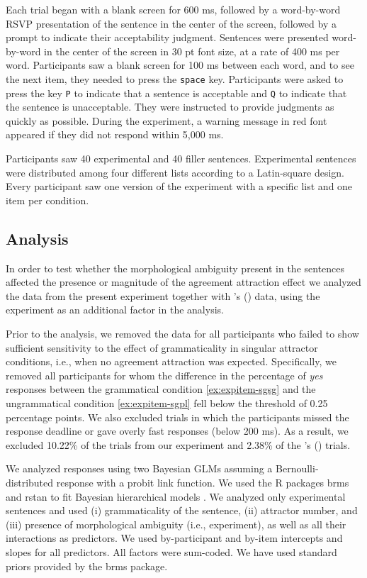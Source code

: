 \documentclass[apacite,linguex]{glossa}\usepackage[]{graphicx}\usepackage[]{color}
\begin{document}
Each trial began with a blank screen for 600 ms, followed by a word-by-word RSVP presentation of the sentence in the center of the screen, followed by a prompt to indicate their acceptability judgment. Sentences were presented word-by-word in the center of the screen in 30 pt font size, at a rate of 400 ms per word. Participants saw a blank screen for 100 ms between each word, and to see the next item, they needed to press the \texttt{space} key. Participants were asked to press the key \texttt{P} to indicate that a sentence is acceptable and \texttt{Q} to indicate that the sentence is unacceptable. They were instructed to provide judgments as quickly as possible. During the experiment, a warning message in red font appeared if they did not respond within 5,000 ms.

Participants saw 40 experimental and 40 filler sentences. Experimental sentences were distributed among four different lists according to a Latin-square design. Every participant saw one version of the experiment with a specific list and one item per condition.

\subsection{Analysis}

In order to test whether the morphological ambiguity present in the \citet{LagoEtAl:2019} sentences affected the presence or magnitude of the agreement attraction effect we analyzed the data from the present experiment together with \citeauthor{LagoEtAl:2019}'s (\citeyear{LagoEtAl:2019}) data, using the experiment as an additional factor in the analysis.
  
Prior to the analysis, we removed the data for all participants who failed to show sufficient sensitivity to the effect of grammaticality in singular attractor conditions, i.e., when no agreement attraction was expected. Specifically, we removed all participants for whom the difference in the percentage of \textit{yes} responses between the grammatical condition \ref{ex:expitem-sgsg} and the ungrammatical condition \ref{ex:expitem-sgpl} fell below the threshold of 0.25 percentage points. We also excluded trials in which the participants missed the response deadline or gave overly fast responses (below 200 ms). As a result, we excluded 10.22\% of the trials from our experiment and 2.38\% of the \citeauthor{LagoEtAl:2019}'s (\citeyear{LagoEtAl:2019}) trials. 

We analyzed responses using two Bayesian GLMs assuming a Bernoulli-distributed response with a probit link function.  We used the R packages brms \citep{brms} and rstan \citep{rstan} to fit Bayesian hierarchical models \citep[e.g.,][]{GelmanHill:2007, NicenboimVasishth:2016}. 
We analyzed only experimental sentences and used (i) grammaticality of the sentence, (ii) attractor number, and (iii) presence of morphological ambiguity (i.e., experiment), as well as all their interactions as predictors. We used by-participant and by-item intercepts and slopes for all predictors. 
All factors were sum-coded. We have used standard priors provided by the brms package. 
\end{document}
